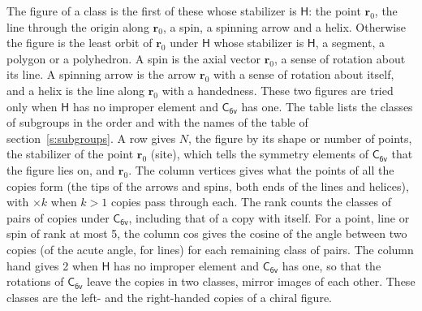 \documentclass[10pt,a4paper]{article}
\numberwithin{equation}{section}
\newcommand{\grp}[1]{\mathsf{#1}}
\newcommand{\pointr}{\mathbf{r}}
\begin{document}
\leavevmode\label{n:head.figure}The figure of a class is the first of these whose stabilizer is $\grp{H}$: the point $\pointr_0$, the line through the origin along $\pointr_0$, a spin, a spinning arrow and a helix. Otherwise the figure is the least orbit of $\pointr_0$ under $\grp{H}$ whose stabilizer is $\grp{H}$, a segment, a polygon or a polyhedron. A spin is the axial vector $\pointr_0$, a sense of rotation about its line. A spinning arrow is the arrow $\pointr_0$ with a sense of rotation about itself, and a helix is the line along $\pointr_0$ with a handedness. These two figures are tried only when $\grp{H}$ has no improper element and $\grp{C_{6v}}$ has one. The table lists the classes of subgroups in the order and with the names of the table of section~\ref{s:subgroups}. \label{n:head.site}A row gives $N$, the figure by its shape or number of points, the stabilizer of the point $\pointr_0$ (site), which tells the symmetry elements of $\grp{C_{6v}}$ that the figure lies on, and $\pointr_0$. \label{n:head.vertices}The column vertices gives what the points of all the copies form (the tips of the arrows and spins, both ends of the lines and helices), with ${\times}k$ when $k > 1$ copies pass through each. \label{n:head.rank}The rank counts the classes of pairs of copies under $\grp{C_{6v}}$, including that of a copy with itself. \label{n:head.cos}For a point, line or spin of rank at most 5, the column cos gives the cosine of the angle between two copies (of the acute angle, for lines) for each remaining class of pairs. \label{n:head.hand}The column hand gives 2 when $\grp{H}$ has no improper element and $\grp{C_{6v}}$ has one, so that the rotations of $\grp{C_{6v}}$ leave the copies in two classes, mirror images of each other. These classes are the left- and the right-handed copies of a chiral figure.
\end{document}
